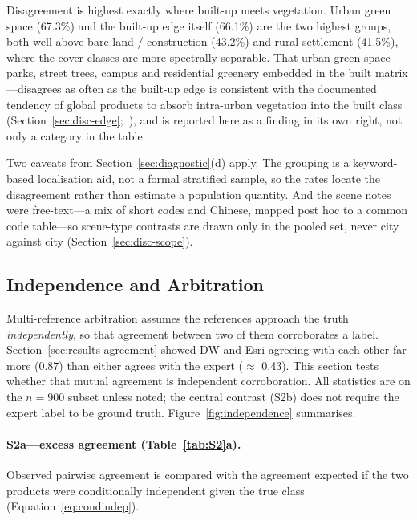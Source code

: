 Disagreement is highest exactly where built-up meets vegetation. Urban green
space (67.3\%) and the built-up edge itself (66.1\%) are the two highest groups,
both well above bare land / construction (43.2\%) and rural settlement (41.5\%),
where the cover classes are more spectrally separable. That urban green
space---parks, street trees, campus and residential greenery embedded in the
built matrix---disagrees as often as the built-up edge is consistent with the
documented tendency of global products
to absorb intra-urban vegetation into the built class
(Section~\ref{sec:disc-edge};~\citealp{yuan2026}), and is reported here as a
finding in its own right, not only a category in the table.

Two caveats from Section~\ref{sec:diagnostic}(d) apply. The grouping is a
keyword-based localisation aid, not a formal stratified sample, so the rates
locate the disagreement rather than estimate a population quantity. And the
scene notes were free-text---a mix of short codes and Chinese, mapped post hoc
to a common code table---so scene-type contrasts are drawn only in the pooled
set, never city against city (Section~\ref{sec:disc-scope}).

\subsection{Independence and Arbitration}\label{sec:results-independence}

Multi-reference arbitration assumes the references approach the truth
\emph{independently}, so that agreement between two of them corroborates a
label. Section~\ref{sec:results-agreement} showed DW and Esri agreeing with each
other far more (0.87) than either agrees with the expert ($\approx$ 0.43). This
section tests whether that mutual agreement is independent corroboration. All
statistics are on the $n = 900$ subset unless noted; the central contrast (S2b)
does not require the expert label to be ground truth. Figure~\ref{fig:independence}
summarises.

\paragraph{S2a---excess agreement (Table~\ref{tab:S2}a).}
Observed pairwise agreement is compared with the agreement expected if the two
products were conditionally independent given the true class
(Equation~\eqref{eq:condindep}).

